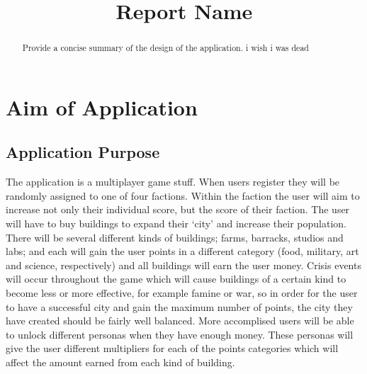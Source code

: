\documentclass{sig-alt-release2}
\begin{document}
\newcommand{\todo}[1]{\textcolor{red}{#1}}


\title{{Report Name}}

\maketitle

\begin{abstract}
Provide a concise summary of the design of the application. i wish i was dead

\end{abstract}

\section{Aim of Application}

\subsection{Application Purpose}

The application is a multiplayer game stuff. When users register they will be randomly assigned to one of four factions. Within the faction the user will aim to increase not only their individual score, but the score of their faction. The user will have to buy buildings to expand their `city' and increase their population. There will be several different kinds of buildings; farms, barracks, studios and labs; and each will gain the user points in a different category (food, military, art and science, respectively) and all buildings will earn the user money. Crisis events will occur throughout the game which will cause buildings of a certain kind to become less or more effective, for example famine or war, so in order for the user to have a successful city and gain the maximum number of points, the city they have created should be fairly well balanced. More accomplised users will be able to unlock different personas when they have enough money. These personas will give the user different multipliers for each of the points categories which will affect the amount earned from each kind of building.
\end{document}
